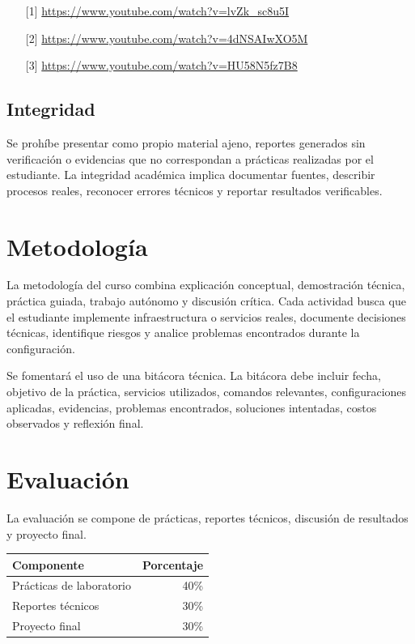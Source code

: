 \documentclass[
  coursetitle={Cómputo Nube y Tecnologías Emergentes},
  coursehours={96},
  coursedate={Verano 2026},
  doctype={Guía del curso},
  otherlangs={english,french},
  authorname={Lázaro},
  authorsurname={Bustio-Martínez},
  authortitle={PhD},
  role={Profesor Investigador},
  email={lbustio@inaoe.mx},
  phone={5559504000},
  ext={7459},
  institution={Instituto Nacional de Astrofísica, Óptica y Electrónica (INAOE)},
  department={Maestría en Ciencias en Tecnologías de Seguridad},
  address={Luis Enrique Erro 1, Sta. Ma. Tonantzintla, San Andrés Cholula, CP 72840, Puebla, México},
  margin={0.5in}
]{lbustio_lecture_notes}
\begin{document}
\begin{itemize}
  \item[{[1]}] \url{https://www.youtube.com/watch?v=lvZk_sc8u5I}
  \item[{[2]}] \url{https://www.youtube.com/watch?v=4dNSAIwXO5M}
  \item[{[3]}] \url{https://www.youtube.com/watch?v=HU58N5fz7B8}
\end{itemize}


\subsection{Integridad}
Se prohíbe presentar como propio material ajeno, reportes generados sin verificación o evidencias que no correspondan a prácticas realizadas por el estudiante. La integridad académica implica documentar fuentes, describir procesos reales, reconocer errores técnicos y reportar resultados verificables.

\section{Metodología}
La metodología del curso combina explicación conceptual, demostración técnica, práctica guiada, trabajo autónomo y discusión crítica. Cada actividad busca que el estudiante implemente infraestructura o servicios reales, documente decisiones técnicas, identifique riesgos y analice problemas encontrados durante la configuración.

Se fomentará el uso de una bitácora técnica. La bitácora debe incluir fecha, objetivo de la práctica, servicios utilizados, comandos relevantes, configuraciones aplicadas, evidencias, problemas encontrados, soluciones intentadas, costos observados y reflexión final.

\section{Evaluación}
La evaluación se compone de prácticas, reportes técnicos, discusión de resultados y proyecto final.

\begin{center}
\begin{tabular}{l r}
\hline
Componente & Porcentaje \\
\hline
Prácticas de laboratorio & 40\% \\
Reportes técnicos & 30\% \\
Proyecto final & 30\% \\
\hline
\end{tabular}
\end{center}
\end{document}
